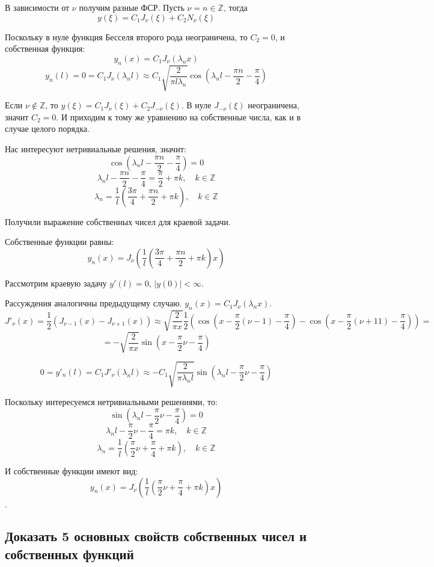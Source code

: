 \documentclass[12pt, a4paper]{report}
\begin{document}
В зависимости от $\nu$ получим разные ФСР. Пусть $\nu = n \in \mathbb{Z}$, тогда
\[ y(\xi) = C_1 J_\nu (\xi) + C_2 N_\nu (\xi)\]

Поскольку в нуле функция Бесселя второго рода неограничена, то $C_2 = 0$, и собственная функция:
\[ y_n (x) = C_1 J_\nu (\lambda_n x)\]
\[ y_n (l) = 0 = C_1 J_\nu(\lambda_n l) \approx C_{1} \sqrt{\frac{2}{\pi l \lambda_n}} \cos(\lambda_n l - \frac{\pi n}{2} - \frac{\pi}{4}) \]

Если $\nu \notin \mathbb{Z}$, то $y(\xi) = C_1 J_\nu (\xi) + C_2 J_{-\nu} (\xi)$. В нуле $J_{-\nu} (\xi)$ неограничена, значит $C_2 = 0$. И приходим к тому же уравнению на собственные числа, как и в случае целого порядка.

Нас интересуют нетривиальные решения, значит:
\[ \cos(\lambda_n l - \frac{\pi n}{2} - \frac{\pi}{4})  = 0\]
\[ \lambda_n l - \frac{\pi n}{2} - \frac{\pi}{4} = \frac{\pi}{2} + \pi k, \quad k \in \mathbb{Z} \]
\[ \lambda_n = \frac{1}{l} (\frac{3\pi}{4} + \frac{\pi n}{2} + \pi k ), \quad k \in \mathbb{Z} \]

Получили выражение собственных чисел для краевой задачи.

Собственные функции равны: 
\[y_n (x) = J_{\nu} (\frac{1}{l} (\frac{3\pi}{4} + \frac{\pi n}{2} + \pi k ) x) \]

Рассмотрим краевую задачу $y'(l) = 0$, $|y(0)| < \infty$.

Рассуждения аналогичны предыдущему случаю. $y_n(x) = C_1 J_\nu (\lambda_n x)$.
\[ J'_\nu (x) = \frac{1}{2} (J_{\nu - 1} (x) - J_{\nu + 1} (x)) \approx \sqrt{\frac{2}{\pi x}} \frac{1}{2} (\cos(x - \frac{\pi}{2}(\nu - 1) - \frac{\pi}{4}) - \cos(x - \frac{\pi}{2}(\nu +1 1) - \frac{\pi}{4})) = \]
\[ = -\sqrt{\frac{2}{\pi x}} \sin(x - \frac{\pi}{2}\nu - \frac{\pi}{4}) \]

\[ 0 = y'_n (l) = C_1 J'_\nu (\lambda_n l) \approx - C_1 \sqrt{\frac{2}{\pi \lambda_n l}} \sin(\lambda_n l - \frac{\pi}{2}\nu - \frac{\pi}{4}) \]

Поскольку интересуемся нетривиальными решениями, то:
\[ \sin(\lambda_n l - \frac{\pi}{2}\nu - \frac{\pi}{4}) = 0 \]
\[ \lambda_n l - \frac{\pi}{2}\nu - \frac{\pi}{4} = \pi k, \quad k \in \mathbb{Z} \]
\[ \lambda_n = \frac{1}{l} (\frac{\pi}{2}\nu + \frac{\pi}{4} + \pi k), \quad k \in \mathbb{Z} \]

И собственные функции имеют вид:
\[ y_n(x) = J_{\nu} (\frac{1}{l} (\frac{\pi}{2}\nu + \frac{\pi}{4} + \pi k) x) \].

\subsection{Доказать 5 основных свойств собственных чисел и собственных функций}
\end{document}
